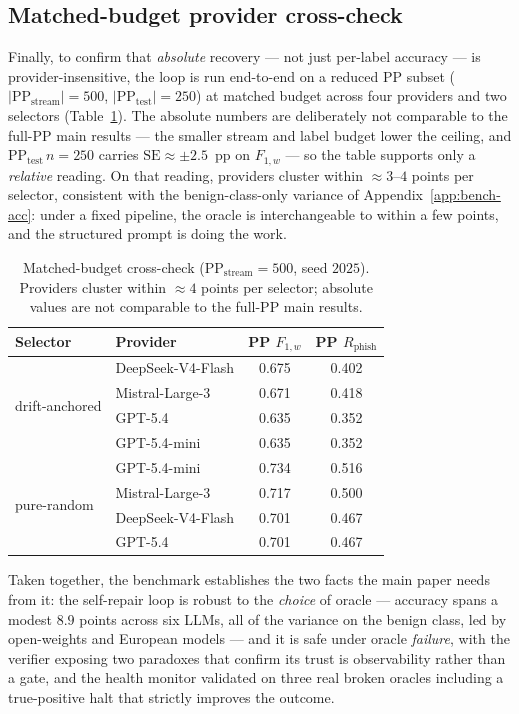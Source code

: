 \subsection{Matched-budget provider cross-check}
\label{app:bench-smallbench}

Finally, to confirm that \emph{absolute} recovery --- not just per-label accuracy
--- is provider-insensitive, the loop is run end-to-end on a reduced PP subset
($|\mathrm{PP_{stream}}|{=}500$, $|\mathrm{PP_{test}}|{=}250$) at matched budget
across four providers and two selectors (Table~\ref{tab:smallbench}). The absolute
numbers are deliberately not comparable to the full-PP main results --- the
smaller stream and label budget lower the ceiling, and $\mathrm{PP_{test}}\,n{=}250$
carries $\mathrm{SE}\approx\pm2.5$~pp on $F_{1,w}$ --- so the table supports only a
\emph{relative} reading. On that reading, providers cluster within
$\approx 3$--$4$ points per selector, consistent with the benign-class-only
variance of Appendix~\ref{app:bench-acc}: under a fixed pipeline, the oracle is
interchangeable to within a few points, and the structured prompt is doing the
work.

\begin{table}[h]
\centering
\caption{Matched-budget cross-check ($\mathrm{PP_{stream}}{=}500$, seed $2025$).
Providers cluster within $\approx 4$ points per selector; absolute values are not
comparable to the full-PP main results.}
\label{tab:smallbench}
\small
\begin{tabular}{@{}llcc@{}}
\toprule
Selector & Provider & PP $F_{1,w}$ & PP $R_{\text{phish}}$ \\
\midrule
\multirow{4}{*}{drift-anchored}
 & DeepSeek-V4-Flash & 0.675 & 0.402 \\
 & Mistral-Large-3   & 0.671 & 0.418 \\
 & GPT-5.4           & 0.635 & 0.352 \\
 & GPT-5.4-mini      & 0.635 & 0.352 \\
\midrule
\multirow{4}{*}{pure-random}
 & GPT-5.4-mini      & 0.734 & 0.516 \\
 & Mistral-Large-3   & 0.717 & 0.500 \\
 & DeepSeek-V4-Flash & 0.701 & 0.467 \\
 & GPT-5.4           & 0.701 & 0.467 \\
\bottomrule
\end{tabular}
\end{table}

Taken together, the benchmark establishes the two facts the main paper needs from
it: the self-repair loop is robust to the \emph{choice} of oracle --- accuracy
spans a modest $8.9$ points across six LLMs, all of the variance on the benign
class, led by open-weights and European models --- and it is safe under oracle
\emph{failure}, with the verifier exposing two paradoxes that confirm its trust is
observability rather than a gate, and the health monitor validated on three real
broken oracles including a true-positive halt that strictly improves the outcome.
